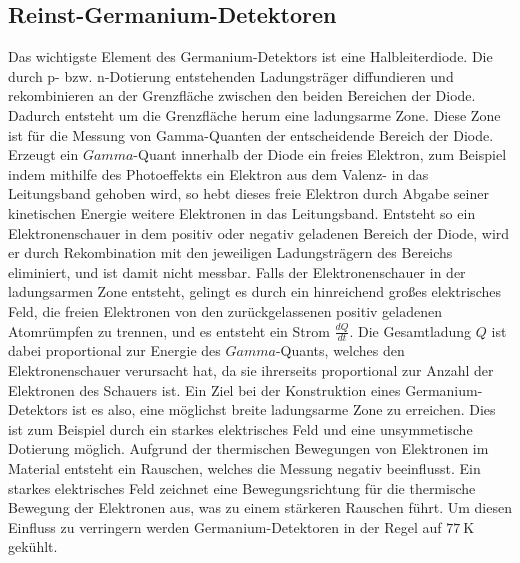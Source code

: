 \subsection{Reinst-Germanium-Detektoren}
\label{subsec:Wirkungsweise}
Das wichtigste Element des Germanium-Detektors ist eine Halbleiterdiode.
Die durch p- bzw. n-Dotierung entstehenden Ladungsträger diffundieren und rekombinieren an der Grenzfläche zwischen den beiden Bereichen der Diode.
Dadurch entsteht um die Grenzfläche herum eine ladungsarme Zone.
Diese Zone ist für die Messung von Gamma-Quanten der entscheidende Bereich der Diode.
Erzeugt ein $Gamma$-Quant innerhalb der Diode ein freies Elektron, zum Beispiel indem mithilfe des Photoeffekts ein Elektron aus dem Valenz- in das Leitungsband gehoben wird, so hebt dieses freie Elektron durch Abgabe seiner kinetischen Energie weitere Elektronen in das Leitungsband.
Entsteht so ein Elektronenschauer in dem positiv oder negativ geladenen Bereich der Diode, wird er durch Rekombination mit den jeweiligen Ladungsträgern des Bereichs eliminiert, und ist damit nicht messbar.
Falls der Elektronenschauer in der ladungsarmen Zone entsteht, gelingt es durch ein hinreichend großes elektrisches Feld, die freien Elektronen von den zurückgelassenen positiv geladenen Atomrümpfen zu trennen, und es entsteht ein Strom $\frac{dQ}{dt}$.
Die Gesamtladung $Q$ ist dabei proportional zur Energie des $Gamma$-Quants, welches den Elektronenschauer verursacht hat, da sie ihrerseits proportional zur Anzahl der Elektronen des Schauers ist.
Ein Ziel bei der Konstruktion eines Germanium-Detektors ist es also, eine möglichst breite ladungsarme Zone zu erreichen.
Dies ist zum Beispiel durch ein starkes elektrisches Feld und eine unsymmetische Dotierung möglich.
Aufgrund der thermischen Bewegungen von Elektronen im Material entsteht ein Rauschen, welches die Messung negativ beeinflusst.
Ein starkes elektrisches Feld zeichnet eine Bewegungsrichtung für die thermische Bewegung der Elektronen aus, was zu einem stärkeren Rauschen führt. 
Um diesen Einfluss zu verringern werden Germanium-Detektoren in der Regel auf $\SI{77}{\kelvin}$ gekühlt.

